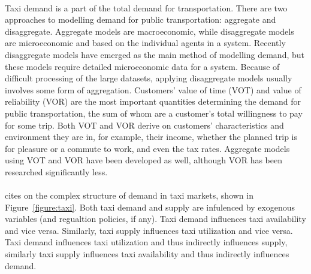 \paragraph{} Taxi demand is a part of the total demand for transportation.
There are two approaches to modelling demand for public transportation:
aggregate and disaggregate. Aggregate models are macroeconomic, while
disaggregate models are microeconomic and based on the individual agents in a
system. Recently disaggregate models have emerged as the main method of
modelling demand, but these models require detailed microeconomic data for a
system. Because of difficult processing of the large datasets, applying
disaggregate models usually involves some form of aggregation. Customers' value
of time (VOT) and value of reliability (VOR) are the most important quantities
determining the demand for public transportation, the sum of whom are a
customer's total willingness to pay for some trip. Both VOT and VOR derive on
customers' characteristics and environment they are in, for example, their
income, whether the planned trip is for pleasure or a commute to work, and even
the tax rates. Aggregate models using VOT and VOR have been developed as well,
although VOR has been researched significantly less.
\parencite{Small2007taxi+urban}

\paragraph{} \textcite{Yang2002taxi+demand} cites
\textcite{Manski1967taxi+demand} on the complex structure of demand in taxi
markets, shown in Figure~\ref{figure:taxi}. Both taxi demand and supply are
infulenced by exogenous variables (and regualtion policies, if any). Taxi
demand influences taxi availability and vice versa. Similarly, taxi supply
influences taxi utilization and vice versa. Taxi demand influences taxi
utilization and thus indirectly influences supply, similarly taxi supply
influences taxi availability and thus indirectly influences demand. 

